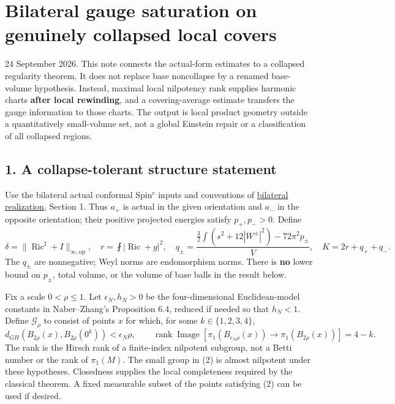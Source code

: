 \documentclass[
  11pt,
]{article}
\author{}
\date{}
\begin{document}
\hypertarget{bilateral-gauge-saturation-on-genuinely-collapsed-local-covers}{%
\section{Bilateral gauge saturation on genuinely collapsed local
covers}\label{bilateral-gauge-saturation-on-genuinely-collapsed-local-covers}}

24 September 2026. This note connects the actual-form estimates to a
collapsed regularity theorem. It does not replace base noncollapse by a
renamed base-volume hypothesis. Instead, maximal local nilpotency rank
supplies harmonic charts \textbf{after local rewinding}, and a
covering-average estimate transfers the gauge information to those
charts. The output is local product geometry outside a quantitatively
small-volume set, not a global Einstein repair or a classification of
all collapsed regions.

\hypertarget{a-collapse-tolerant-structure-statement}{%
\subsection{1. A collapse-tolerant structure
statement}\label{a-collapse-tolerant-structure-statement}}

Use the bilateral actual conformal Spin\(^c\) inputs and conventions of
\href{20260924_bilateral_realization.md}{bilateral realization}, Section
1. Thus \(a_+\) is actual in the given orientation and \(a_-\) in the
opposite orientation; their positive projected energies satisfy
\(p_+,p_->0\). Define \[
 \delta=\|\operatorname{Ric}^\sharp+I\|_{\infty,\mathrm{op}},
 \quad r=\fint|\operatorname{Ric}+g|^2,
 \quad q_\pm=\frac{\frac32\int(s^2+12|W^\pm|^2)-72\pi^2p_\pm}{V},
 \quad K=2r+q_++q_-.
 \tag{1}
\] The \(q_\pm\) are nonnegative; Weyl norms are endomorphism norms.
There is \textbf{no} lower bound on \(p_\pm\), total volume, or the
volume of base balls in the result below.

Fix a scale \(0<\rho\le1\). Let \(\epsilon_N,h_N>0\) be the
four-dimensional Euclidean-model constants in Naber--Zhang's Proposition
6.4, reduced if needed so that \(h_N<1\). Define \(\mathcal G_\rho\) to
consist of points \(x\) for which, for some \(k\in\{1,2,3,4\}\), \[
 d_{GH}(B_{2\rho}(x),B_{2\rho}(0^k))<\epsilon_N\rho,
 \qquad
 \operatorname{rank}\operatorname{Image}
 [\pi_1(B_{\epsilon_N\rho}(x))\to\pi_1(B_{2\rho}(x))]=4-k.
 \tag{2}
\] The rank is the Hirsch rank of a finite-index nilpotent subgroup, not
a Betti number or the rank of \(\pi_1(M)\). The small group in (2) is
almost nilpotent under these hypotheses. Closedness supplies the local
completeness required by the classical theorem. A fixed measurable
subset of the points satisfying (2) can be used if desired.
\end{document}
